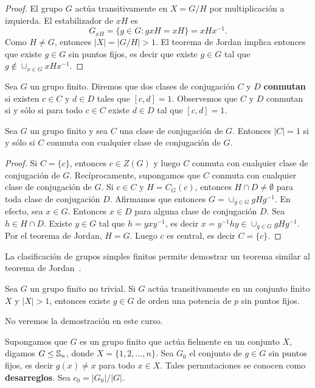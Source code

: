 \begin{proof}
El grupo $G$ actúa transitivamente en $X=G/H$ por multiplicación a izquierda. 
El estabilizador de $xH$ es 
\[
G_{xH}=\{g\in G:gxH=xH\}=xHx^{-1}.
\]
Como $H\ne G$, entonces $|X|=|G/H|>1$. El teorema de Jordan implica entonces que existe $g\in G$ sin puntos fijos, es decir
que existe $g\in G$ tal que $g\not\in\cup_{x\in G}xHx^{-1}$. 
\end{proof}

Sea $G$ un grupo finito. Diremos que dos clases de conjugación $C$ y $D$ \textbf{conmutan} si existen 
$c\in C$ y $d\in D$ tales que $[c,d]=1$. 
Observemos que $C$ y $D$ conmutan si y sólo si para todo $c\in C$ existe $d\in D$ tal que $[c,d]=1$. 

\begin{corollary}[Wildon]
    Sea $G$ un grupo finito y sea $C$ una clase de conjugación de $G$. Entonces
    $|C|=1$ si y sólo si $C$ conmuta con cualquier clase de conjugación de $G$. 
\end{corollary}
    
\begin{proof}
    Si $C=\{c\}$, entonces $c\in Z(G)$ y luego $C$ conmuta con cualquier clase de conjugación de $G$. Recíprocamente, supongamos que 
    $C$ conmuta con cualquier clase de conjugación de $G$. Si $c\in C$ y $H=C_G(c)$, entonces $H\cap D\ne\emptyset$ para toda
    clase de conjugación $D$. Afirmamos que entonces $G=\cup_{g\in G}gHg^{-1}$. En efecto, sea $x\in G$. Entonces $x\in D$ 
    para alguna clase de conjugación $D$. 
    Sea 
    $h\in H\cap D$. Existe $y\in G$ tal que $h=yxy^{-1}$, es decir $x=y^{-1}hy\in \cup_{g\in G}gHg^{-1}$. Por el teorema de Jordan, 
    $H=G$. Luego $c$ es central, es decir $C=\{c\}$. 
\end{proof}

La clasificación de grupos simples finitos permite demostrar un teorema
similar al teorema de Jordan~\cite{MR636194}. 

\begin{theorem}
Sea $G$ un grupo finito no trivial. Si $G$ actúa transitivamente en un conjunto finito $X$ y $|X|>1$, entonces
existe $g\in G$ de orden una potencia de $p$ sin puntos fijos. 
\end{theorem}

No veremos la demostración en este curso. 

Supongamos que $G$ es un grupo finito que actúa fielmente en un conjunto $X$,
digamos $G\leq\mathbb{S}_n$, donde $X=\{1,2,\dots,n\}$. Sea 
$G_0$ el conjunto de $g\in G$ sin puntos fijos, es decir $g(x)\ne x$ para todo $x\in X$. 
Tales permutaciones se conocen como \textbf{desarreglos}. 
Sea $c_0=|G_0|/|G|$. 


